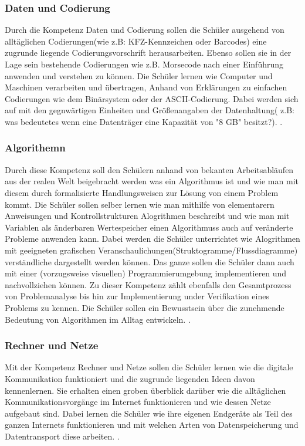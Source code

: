 \subsubsection{Daten und Codierung}

Durch die Kompetenz Daten und Codierung sollen die Schüler ausgehend von alltäglichen Codierungen(wie z.B: KFZ-Kennzeichen oder Barcodes) eine zugrunde liegende Codierungsvorschrift herausarbeiten. Ebenso sollen sie in der Lage sein bestehende Codierungen wie z.B. Morsecode nach einer Einführung anwenden und verstehen zu können. Die Schüler lernen wie Computer und Maschinen verarbeiten und übertragen, Anhand von Erklärungen zu einfachen Codierungen wie dem Binärsystem oder der ASCII-Codierung. Dabei werden sich auf mit den gegnwärtigen Einheiten und Größenangaben der Datenhaltung( z.B: was bedeutetes wenn eine Datenträger eine Kapazität von "8 GB" besitzt?). \cite{Daten}.

\subsubsection{Algorithemn}

Durch diese Kompetenz soll den Schülern anhand von bekanten Arbeitsabläufen aus der realen Welt beigebracht werden was ein Algorithmus ist und wie man mit diesem durch formalisierte Handlungsweisen zur Lösung von einem Problem kommt. Die Schüler sollen selber lernen wie man mithilfe von elementarern Anweisungen und Kontrollstrukturen Alogrithmen beschreibt und wie man mit Variablen als änderbaren Wertespeicher einen Algorithmuss auch auf veränderte Probleme anwenden kann. Dabei werden die Schüler unterrichtet wie Alogrithmen mit geeigneten grafischen Veranschaulichungen(Struktogramme/Flussdiagramme) verständliche dargestellt werden können. Das ganze sollen die Schüler dann auch mit einer (vorzugsweise visuellen) Programmierumgebung implementieren und nachvollziehen können. Zu dieser Kompetenz zählt ebenfalls den Gesamtprozess von Problemanalyse bis hin zur Implementierung under Verifikation eines Problems zu kennen. Die Schüler sollen ein Bewusstsein über die zunehmende Bedeutung von Algorithmen im Alltag entwickeln.
\cite{Algo}.

\subsubsection{Rechner und Netze}

Mit der Kompetenz Rechner und Netze sollen die Schüler lernen wie die digitale Kommunikation funktioniert und die zugrunde liegenden Ideen davon kennenlernen. Sie erhalten einen groben überblick darüber wie die alltäglichen Kommunikationsvorgänge im Internet funktionieren und wie dessen Netze aufgebaut sind. Dabei lernen die Schüler wie ihre eigenen Endgeräte als Teil des ganzen Internets funktionieren und mit welchen Arten von Datenspeicherung und Datentransport diese arbeiten.
\cite{Rechner}.


